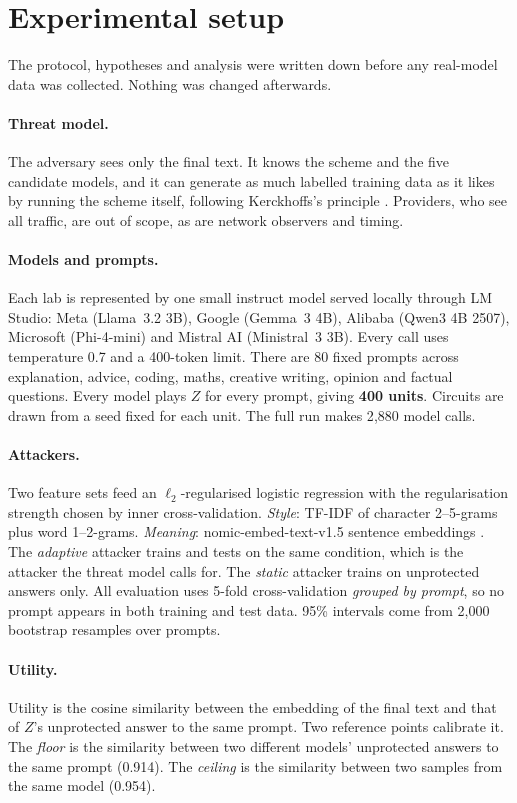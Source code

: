 \documentclass[11pt]{article}
\begin{document}
\section{Experimental setup}

The protocol, hypotheses and analysis were written down before any real-model data was collected. Nothing was changed afterwards.

\paragraph{Threat model.} The adversary sees only the final text. It knows the scheme and the five candidate models, and it can generate as much labelled training data as it likes by running the scheme itself, following Kerckhoffs's principle \cite{kerckhoffs}. Providers, who see all traffic, are out of scope, as are network observers and timing.

\paragraph{Models and prompts.} Each lab is represented by one small instruct model served locally through LM Studio: Meta (Llama~3.2 3B), Google (Gemma~3 4B), Alibaba (Qwen3 4B 2507), Microsoft (Phi-4-mini) and Mistral AI (Ministral~3 3B). Every call uses temperature 0.7 and a 400-token limit. There are 80 fixed prompts across explanation, advice, coding, maths, creative writing, opinion and factual questions. Every model plays $Z$ for every prompt, giving \textbf{400 units}. Circuits are drawn from a seed fixed for each unit. The full run makes 2{,}880 model calls.

\paragraph{Attackers.} Two feature sets feed an $\ell_2$-regularised logistic regression with the regularisation strength chosen by inner cross-validation. \emph{Style}: TF-IDF of character 2--5-grams plus word 1--2-grams. \emph{Meaning}: nomic-embed-text-v1.5 sentence embeddings \cite{nomic}. The \emph{adaptive} attacker trains and tests on the same condition, which is the attacker the threat model calls for. The \emph{static} attacker trains on unprotected answers only. All evaluation uses 5-fold cross-validation \emph{grouped by prompt}, so no prompt appears in both training and test data. 95\% intervals come from 2{,}000 bootstrap resamples over prompts.

\paragraph{Utility.} Utility is the cosine similarity between the embedding of the final text and that of $Z$'s unprotected answer to the same prompt. Two reference points calibrate it. The \emph{floor} is the similarity between two different models' unprotected answers to the same prompt (0.914). The \emph{ceiling} is the similarity between two samples from the same model (0.954).
\end{document}
